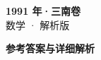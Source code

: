 \documentclass[zihao=-4, a4paper]{ctexart}
\begin{document}
\begin{center}
  {\Large\bfseries 1991 年·三南卷}\\[4pt]
  {\large 数学 · 解析版}
\end{center}
\medskip
{}

\clearpage
{}
\begin{center}{\Large\bfseries 参考答案与详细解析}\end{center}
\medskip

\end{document}
